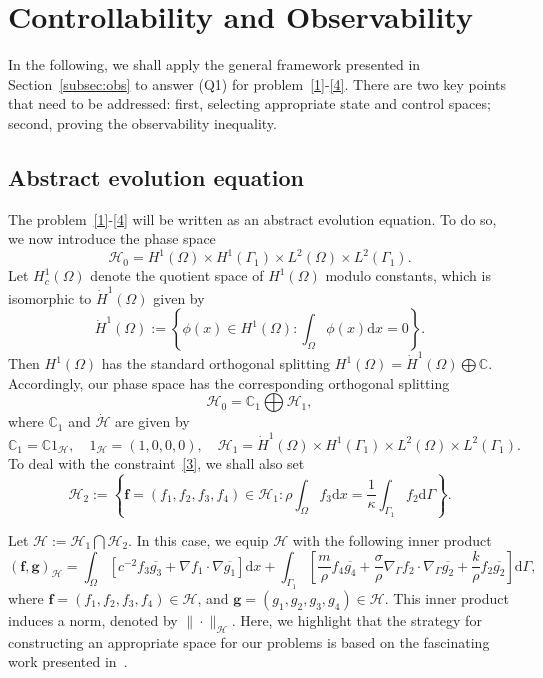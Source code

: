 \documentclass[10pt]{elsarticle}
\begin{document}
\section{Controllability and Observability}
\label{sec:ctrl_obs}
In the following, we shall apply the general framework presented in Section~\ref{subsec:obs} to answer (Q1) for problem~\eqref{1}-\eqref{4}. There are two key points that need to be addressed: first, selecting appropriate state and control spaces; second, proving the observability inequality.

\subsection{Abstract evolution equation}
\label{subsec:evolution}

The problem~\eqref{1}-\eqref{4} will be written as an abstract evolution equation. To do so, we now introduce the phase space
\[
\mathcal{H}_0 = H^1(\Omega)\times H^1(\Gamma_1) \times L^2(\Omega) \times L^2(\Gamma_1).
\]
Let $H^1_{c}(\Omega)$ denote the quotient space of $H^1(\Omega)$ modulo constants, which is isomorphic to $\dot{H}^1(\Omega)$ given by
\[
\dot{H}^1(\Omega) := \left\{\phi(x)\in H^1(\Omega): \int_{\Omega}\phi(x)\mathrm{d}x=0\right\}. 
\]
Then $H^1(\Omega)$ has the standard orthogonal splitting $H^1(\Omega) = \dot{H}^1(\Omega)\bigoplus \mathbb{C}$.
Accordingly, our phase space has the corresponding orthogonal splitting 
\[
\mathcal{H}_0 = \mathbb{C}_1\bigoplus \mathcal{H}_1,
\] 
where $\mathbb{C}_1$ and $\dot{\mathcal{H}}$ are given by
\[
	\mathbb{C}_1= \mathbb{C}1_{\mathcal{H}}, \quad 1_{\mathcal{H}} = (1, 0, 0, 0), \quad \mathcal{H}_1 = \dot{H}^1(\Omega)\times H^1(\Gamma_1) \times L^2(\Omega) \times L^2(\Gamma_1).
\]
To deal with the constraint~\eqref{3}, we shall also set
\[
	{\mathcal{H}_2} :=\left\{\mathbf{ f}=(f_1, f_2, f_3, f_4)\in\mathcal{H}_1: \rho\int_{\Omega}f_3 \mathrm{d}x = \frac{1}{\kappa}\int_{\Gamma_1}f_2 \mathrm{d}\Gamma\right\}.
\]

Let $\mathcal{H} := {\mathcal{H}_1}\bigcap {\mathcal{H}_2}$.
In this case, we equip ${\mathcal{H}}$ with the following inner product
\[
	(\mathbf{ f}, \mathbf{ g})_{\mathcal{H}}=\int_{\Omega}\left[c^{-2}f_3{\overline{g_{3}}} +\nabla f_1\cdot{\nabla \overline{g_1}}\right]\mathrm{d}x+ \int_{\Gamma_{1}}\left[\frac{m}{\rho}f_4{\overline{g_{4}}} + \frac{\sigma}{\rho}\nabla_{\Gamma} f_2\cdot{\nabla_{\Gamma} \overline{g_2}} + \frac{k}{\rho}f_2{\overline{g_{2}}}\right]\mathrm{d}\Gamma,
\]
where $\mathbf{ f} =(f_1, f_2, f_3, f_4)\in\mathcal{H}$, and $\mathbf{ g } = (g_1, g_2, g_3, g_4)\in\mathcal{H}$.
This inner product induces a norm, denoted by $\|\cdot\|_{\mathcal{H}}$. Here, we highlight that the strategy for constructing an appropriate space for our problems is based on the fascinating work presented in~\cite[Chapter 6]{mugnolo2024wave}. 
\end{document}

